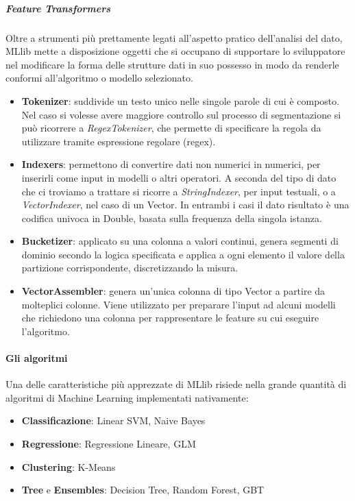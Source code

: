 \subparagraph{Feature Transformers} 
Oltre a strumenti più prettamente legati all'aspetto pratico dell'analisi del dato, MLlib mette a disposizione oggetti che si occupano di supportare lo sviluppatore nel modificare la forma delle strutture dati in suo possesso in modo da renderle conformi all'algoritmo o modello selezionato.
\begin{itemize}
	\item \textbf{Tokenizer}: suddivide un testo unico nelle singole parole di cui è composto. Nel caso si volesse avere maggiore controllo sul processo di segmentazione si può ricorrere a \textit{RegexTokenizer}, che permette di specificare la regola da utilizzare tramite espressione regolare (regex).
	\item \textbf{Indexers}: permettono di convertire dati non numerici in numerici, per inserirli come input in modelli o altri operatori. A seconda del tipo di dato che ci troviamo a trattare si ricorre a \textit{StringIndexer}, per input testuali, o a \textit{VectorIndexer}, nel caso di un Vector. In entrambi i casi il dato risultato è una codifica univoca in Double, basata sulla frequenza della singola istanza.
	\item \textbf{Bucketizer}: applicato su una colonna a valori continui, genera segmenti di dominio secondo la logica specificata e applica a ogni elemento il valore della partizione corrispondente, discretizzando la misura.
	\item \textbf{VectorAssembler}: genera un'unica colonna di tipo Vector a partire da molteplici colonne. Viene utilizzato per preparare l'input ad alcuni modelli che richiedono una colonna per rappresentare le feature su cui eseguire l'algoritmo.
\end{itemize}

\paragraph{Gli algoritmi}
Una delle caratteristiche più apprezzate di MLlib risiede nella grande quantità di algoritmi di Machine Learning implementati nativamente:
\begin{itemize}
	\item \textbf{Classificazione}: Linear SVM, Naive Bayes
	\item \textbf{Regressione}: Regressione Lineare, GLM
	\item \textbf{Clustering}: K-Means
	\item \textbf{Tree} e \textbf{Ensembles}: Decision Tree, Random Forest, GBT
\end{itemize}
\pagebreak

